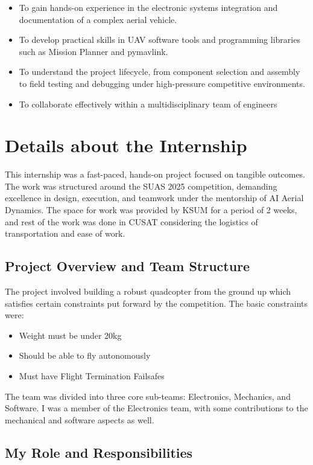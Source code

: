 \begin{itemize}
	\item To gain hands-on experience in the electronic systems integration and documentation of a complex aerial vehicle.
	\item To develop practical skills in UAV software tools and programming libraries such as Mission Planner and pymavlink.
	\item To understand the project lifecycle, from component selection and assembly to field testing and debugging under high-pressure competitive environments.
	\item To collaborate effectively within a multidisciplinary team of engineers
\end{itemize}

\section{Details about the Internship}

This internship was a fast-paced, hands-on project focused on tangible outcomes. The work was structured around the SUAS 2025 competition, demanding excellence in design, execution, and teamwork under the mentorship of AI Aerial Dynamics. The space for work was provided by KSUM for a period of 2 weeks, and rest of the work was done in CUSAT considering the logistics of transportation and ease of work.

\subsection{Project Overview and Team Structure}

The project involved building a robust quadcopter from the ground up which satisfies certain constraints put forward by the competition. The basic constraints were:
\begin{itemize}
	\item Weight must be under 20kg
	\item Should be able to fly autonomously
	\item Must have Flight Termination Failsafes
\end{itemize}

The team was divided into three core sub-teams: Electronics, Mechanics, and Software. I was a member of the Electronics team, with some contributions to the mechanical and software aspects as well.

\subsection{My Role and Responsibilities}


